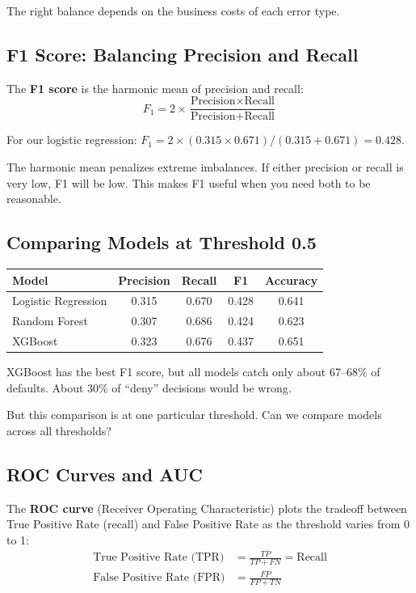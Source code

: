 \documentclass[11pt,a4paper]{article}
\newcommand{\keyword}[1]{\textbf{\textcolor{AccentOrange}{#1}}}
\begin{document}
The right balance depends on the business costs of each error type.

\subsection{F1 Score: Balancing Precision and Recall}

The \keyword{F1 score} is the harmonic mean of precision and recall:
\[
F_1 = 2 \times \frac{\text{Precision} \times \text{Recall}}{\text{Precision} + \text{Recall}}
\]

For our logistic regression: $F_1 = 2 \times (0.315 \times 0.671) / (0.315 + 0.671) = 0.428$.

The harmonic mean penalizes extreme imbalances. If either precision or recall is very low, F1 will be low. This makes F1 useful when you need both to be reasonable.

\subsection{Comparing Models at Threshold 0.5}

\begin{center}
\begin{tabular}{lcccc}
\toprule
\textbf{Model} & \textbf{Precision} & \textbf{Recall} & \textbf{F1} & \textbf{Accuracy} \\
\midrule
Logistic Regression & 0.315 & 0.670 & 0.428 & 0.641 \\
Random Forest & 0.307 & 0.686 & 0.424 & 0.623 \\
XGBoost & 0.323 & 0.676 & 0.437 & 0.651 \\
\bottomrule
\end{tabular}
\end{center}

XGBoost has the best F1 score, but all models catch only about 67--68\% of defaults. About 30\% of ``deny'' decisions would be wrong.

But this comparison is at one particular threshold. Can we compare models across all thresholds?

\subsection{ROC Curves and AUC}

The \keyword{ROC curve} (Receiver Operating Characteristic) plots the tradeoff between True Positive Rate (recall) and False Positive Rate as the threshold varies from 0 to 1:
\begin{align*}
\text{True Positive Rate (TPR)} &= \frac{TP}{TP + FN} = \text{Recall} \\
\text{False Positive Rate (FPR)} &= \frac{FP}{FP + TN}
\end{align*}
\end{document}

